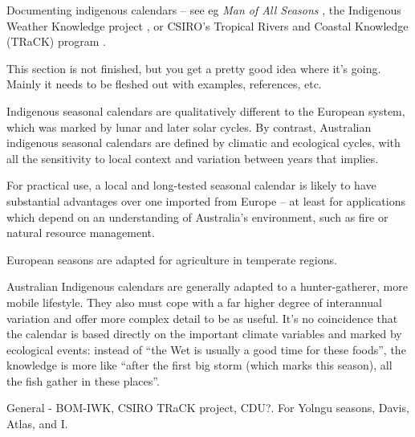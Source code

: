 Documenting indigenous calendars – see eg \textit{Man of All Seasons} \citep{davis1989},
the Indigenous Weather Knowledge project \citet{BOM-iwk},
or CSIRO’s Tropical Rivers and Coastal Knowledge (TRaCK) program \citep{CSIROcals,oconnor2010}.


This section is not finished, but you get a pretty good idea where it's
going.  Mainly it needs to be fleshed out with examples, references, etc.

Indigenous seasonal calendars are qualitatively different to the European
system, which was marked by lunar and later solar cycles.  By contrast,
Australian indigenous seasonal calendars are defined by climatic and ecological
cycles, with all the sensitivity to local context and variation between years
that implies.

For practical use, a local and long-tested seasonal calendar is likely to have
substantial advantages over one imported from Europe – at least for
applications which depend on an understanding of Australia's environment, such
as fire or natural resource management.

European seasons are adapted for agriculture in temperate regions.

Australian Indigenous calendars are generally adapted to a hunter-gatherer,
more mobile lifestyle.  They also must cope with a far higher degree of
interannual variation and offer more complex detail to be as useful.  It's no
coincidence that the calendar is based directly on the important climate
variables and marked by ecological events:  instead of ``the Wet is usually a
good time for these foods'', the knowledge is more like ``after the first big
storm (which marks this season), all the fish gather in these places''.




General - BOM-IWK, CSIRO TRaCK project, CDU?.  For Yolngu seasons, Davis, Atlas, and I.




